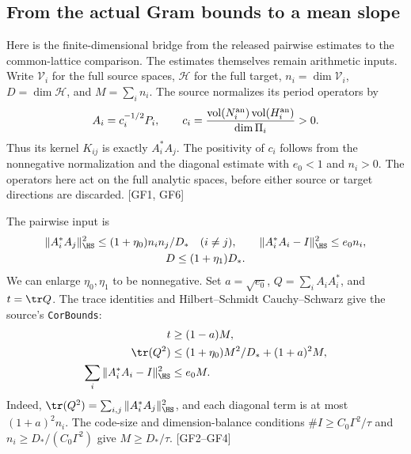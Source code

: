 \subsection{From the actual Gram bounds to a mean slope}\label{sec:gram-to-slope}

Here is the finite-dimensional bridge from the released pairwise estimates to
the common-lattice comparison.  The estimates themselves remain arithmetic
inputs.  Write $\mathcal V_i$ for the full source spaces, $\mathcal H$ for the
full target, $n_i=\dim\mathcal V_i$, $D=\dim\mathcal H$, and $M=\sum_i n_i$.
The source normalizes its period operators by
\[
A_i=c_i^{-1/2}P_i,\qquad
c_i=\frac{\operatorname{vol}(N_i^{\rm an})
                  \operatorname{vol}(H_i^{\rm an})}{\dim\Pi_i}>0.
\]
Thus its kernel $K_{ij}$ is exactly $A_i^*A_j$.
The positivity of $c_i$ follows from the nonnegative normalization and the
diagonal estimate with $e_0<1$ and $n_i>0$.  The operators here act on the full
analytic spaces, before either source or target directions are discarded.
\textsf{[GF1, GF6]}

The pairwise input is
\begin{gather*}
\|A_i^*A_j\|_{\HS}^2\le(1+\eta_0)n_in_j/D_*\quad(i\ne j),\qquad
\|A_i^*A_i-I\|_{\HS}^2\le e_0n_i,\\
D\le(1+\eta_1)D_*.
\end{gather*}
We can enlarge $\eta_0,\eta_1$ to be nonnegative.  Set $a=\sqrt{e_0}$,
$Q=\sum_iA_iA_i^*$, and $t=\tr Q$.  The trace identities and
Hilbert--Schmidt Cauchy--Schwarz give the source's \texttt{CorBounds}:
\begin{equation}\label{eq:full-cor-bounds}
\begin{split}
t&\ge(1-a)M,\\
\tr(Q^2)&\le(1+\eta_0)M^2/D_*+(1+a)^2M,\\
\sum_i\|A_i^*A_i-I\|_{\HS}^2&\le e_0M.
\end{split}
\end{equation}
Indeed, $\tr(Q^2)=\sum_{i,j}\|A_i^*A_j\|_{\HS}^2$, and each diagonal
term is at most $(1+a)^2n_i$.  The code-size and dimension-balance conditions
$\#I\ge C_0\Gamma^2/\tau$ and
$n_i\ge D_*/(C_0\Gamma^2)$ give $M\ge D_*/\tau$.
\textsf{[GF2--GF4]}

